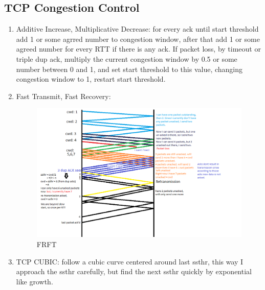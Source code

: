 \documentclass[12pt]{book}
\begin{document}
\subsection{TCP Congestion Control}
\begin{enumerate}
    \item Additive Increase, Multiplicative Decrease: for every ack until start threshold add 1 or some agrred number to congestion window, after that add 1 or some agreed number for every RTT if there is any ack. If packet loss, by timeout or triple dup ack, multiply the current congestion window by 0.5 or some number between 0 and 1, and set start threshold to this value, changing congestion window to 1, restart start threshold.
    \item Fast Transmit, Fast Recovery:
    \begin{figure}[H]
        \centering
        \includegraphics[width = \textwidth]{Pictures/fast transmit, fast recovery.png}
        \caption{FRFT}
        \label{fig:FRFT}
    \end{figure}
    \item TCP CUBIC: follow a cubic curve centered around last ssthr, this way I approach the ssthr carefully, but find the next ssthr quickly by exponential like growth.
\end{enumerate}
\end{document}
